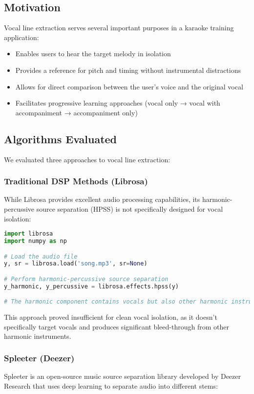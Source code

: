 \documentclass[conference]{IEEEtran}
\begin{document}
\subsection{Motivation}
Vocal line extraction serves several important purposes in a karaoke training application:
\begin{itemize}
    \item Enables users to hear the target melody in isolation
    \item Provides a reference for pitch and timing without instrumental distractions
    \item Allows for direct comparison between the user's voice and the original vocal
    \item Facilitates progressive learning approaches (vocal only → vocal with accompaniment → accompaniment only)
\end{itemize}

\subsection{Algorithms Evaluated}
We evaluated three approaches to vocal line extraction:

\subsubsection{Traditional DSP Methods (Librosa)}
While Librosa provides excellent audio processing capabilities, its harmonic-percussive source separation (HPSS) \cite{fitzgerald2010hpss} is not specifically designed for vocal isolation:

\begin{lstlisting}[language=Python]
import librosa
import numpy as np

# Load the audio file
y, sr = librosa.load('song.mp3', sr=None)

# Perform harmonic-percussive source separation
y_harmonic, y_percussive = librosa.effects.hpss(y)

# The harmonic component contains vocals but also other harmonic instruments
\end{lstlisting}

This approach proved insufficient for clean vocal isolation, as it doesn't specifically target vocals and produces significant bleed-through from other harmonic instruments.

\subsubsection{Spleeter (Deezer)}
Spleeter \cite{stoter2020spleeter} is an open-source music source separation library developed by Deezer Research that uses deep learning to separate audio into different stems:
\end{document}
